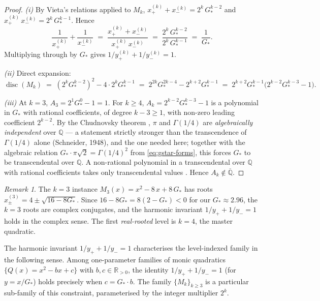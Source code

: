 \documentclass[11pt,reqno]{amsart}
\theoremstyle{plain}
\theoremstyle{definition}
\theoremstyle{remark}
\newtheorem{remark}[theorem]{Remark}
\numberwithin{equation}{section}
\newcommand{\Gstar}{G_{\!*}}
\newcommand{\disc}{\operatorname{disc}}
\begin{document}
\begin{proof}
\textit{(i)} By Vieta's relations applied to $M_{k}$,
$x_{+}^{(k)} + x_{-}^{(k)} = 2^{k}\,\Gstar^{k-2}$ and
$x_{+}^{(k)}\,x_{-}^{(k)} = 2^{k}\,\Gstar^{k-1}$. Hence
\[
  \frac{1}{x_{+}^{(k)}} + \frac{1}{x_{-}^{(k)}}
  \;=\; \frac{x_{+}^{(k)} + x_{-}^{(k)}}{x_{+}^{(k)}\,x_{-}^{(k)}}
  \;=\; \frac{2^{k}\,\Gstar^{k-2}}{2^{k}\,\Gstar^{k-1}}
  \;=\; \frac{1}{\Gstar}.
\]
Multiplying through by $\Gstar$ gives
$1/y_{+}^{(k)} + 1/y_{-}^{(k)} = 1$.

\textit{(ii)} Direct expansion:
\[
  \disc(M_{k}) \;=\; (2^{k}\Gstar^{k-2})^{2} - 4 \cdot 2^{k}\Gstar^{k-1}
              \;=\; 2^{2k}\Gstar^{2k-4} - 2^{k+2}\Gstar^{k-1}
              \;=\; 2^{k+2}\Gstar^{k-1}\bigl(2^{k-2}\Gstar^{k-3} - 1\bigr).
\]

\textit{(iii)} At $k=3$, $A_{3} = 2^{1}\Gstar^{0} - 1 = 1$. For
$k \geq 4$, $A_{k} = 2^{k-2}\Gstar^{k-3} - 1$ is a polynomial in
$\Gstar$ with rational coefficients, of degree $k - 3 \geq 1$, with
non-zero leading coefficient $2^{k-2}$. By the Chudnovsky
theorem \cite{chudnovsky1976}, $\pi$ and $\Gamma(1/4)$ are
\emph{algebraically independent} over $\mathbb{Q}$ --- a statement
strictly stronger than the transcendence of $\Gamma(1/4)$ alone
(Schneider, 1948), and the one needed here; together with the algebraic
relation $\Gstar\cdot\pi\sqrt{2} = \Gamma(1/4)^{2}$ from
\eqref{eq:gstar-forms}, this forces $\Gstar$ to be transcendental over
$\mathbb{Q}$. A
non-rational polynomial in a transcendental over $\mathbb{Q}$ with
rational coefficients takes only transcendental values
\cite[\S 1.4]{waldschmidt2000}. Hence $A_{k} \notin \overline{\mathbb{Q}}$.
\end{proof}

\begin{remark}
The $k=3$ instance $M_{3}(x) = x^{2} - 8\,x + 8\,\Gstar$ has roots
$x_{\pm}^{(3)} = 4 \pm \sqrt{16 - 8\Gstar}$. Since
$16 - 8\Gstar = 8(2 - \Gstar) < 0$ for our $\Gstar \approx 2.96$, the
$k=3$ roots are complex conjugates, and the harmonic invariant
$1/y_{+} + 1/y_{-} = 1$ holds in the complex sense. The first
\emph{real-rooted} level is $k = 4$, the master quadratic.
\end{remark}

The harmonic invariant $1/y_{+} + 1/y_{-} = 1$ characterises the
level-indexed family in the following sense. Among one-parameter
families of monic quadratics
$\{Q(x) = x^{2} - bx + c\}$ with $b, c \in \mathbb{R}_{>0}$, the
identity $1/y_{+} + 1/y_{-} = 1$ (for $y = x/\Gstar$) holds precisely
when $c = \Gstar \cdot b$. The family $\{M_{k}\}_{k \geq 3}$ is a
particular sub-family of this constraint, parameterised by the
integer multiplier $2^{k}$.
\end{document}
